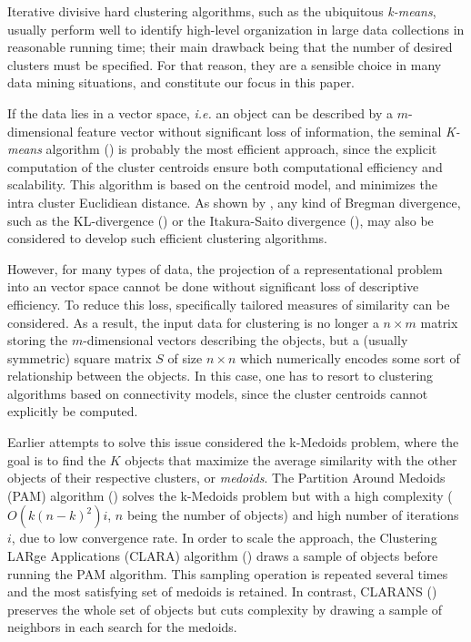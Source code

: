 \documentclass[a4paper,twoside]{article}
\begin{document}
Iterative divisive hard clustering algorithms, such as the ubiquitous \emph{k-means}, usually perform well to identify high-level organization in large data collections in reasonable running time; their main drawback being that the number of desired clusters must be specified. For that reason, they are a sensible choice in many data mining situations, and constitute our focus in this paper.

If the data lies in a vector space, \textit{i.e.} an object can be described by a $m$-dimensional feature vector without significant loss of information, the seminal \emph{K-means} algorithm (\cite{macQueenBsmsp67}) is probably the most efficient approach, since the explicit computation of the cluster centroids ensure both computational efficiency and scalability. This algorithm is  based on the centroid model, and minimizes the intra cluster Euclidiean distance. As shown by \cite{Banerjee:2005:CBD:1046920.1194902}, any kind of Bregman divergence, such as the KL-divergence (\cite{Dhillon:2003:DIT:944919.944973}) or the Itakura-Saito divergence (\cite{linde:algorithm}), may also be considered to develop such efficient clustering algorithms.

However, for many types of data, the projection of a representational problem into an vector space cannot be done without significant loss of descriptive efficiency. To reduce this loss, specifically tailored measures of similarity can be considered. As a result, the input data for clustering is no longer a $n \times m$ matrix storing the $m$-dimensional vectors describing the objects, but a (usually symmetric) square matrix $S$ of size $n \times n$ which numerically encodes some sort of relationship between the objects. In this case, one has to resort to clustering algorithms based on connectivity models, since the cluster centroids cannot explicitly be computed.

Earlier attempts to solve this issue considered the k-Medoids problem, where the goal is to find the $K$ objects that maximize the average similarity with the other objects of their respective clusters, or \emph{medoids}. The Partition Around Medoids (PAM) algorithm (\cite{KaufmanRousseeuw90}) solves the k-Medoids problem but with a high complexity ($O(k(n-k)^2)i$, $n$ being the number of objects) and high number of iterations $i$, due to low convergence rate. In order to scale the approach, the Clustering LARge Applications (CLARA) algorithm (\cite{KaufmanRousseeuw90}) draws a sample of objects before running the PAM algorithm. This sampling operation is repeated several times and the most satisfying set of medoids is retained. In contrast, CLARANS (\cite{Ng:1994:EEC:645920.672827}) preserves the whole set of objects but cuts complexity by  drawing a sample of neighbors in each search for the medoids.
\end{document}
